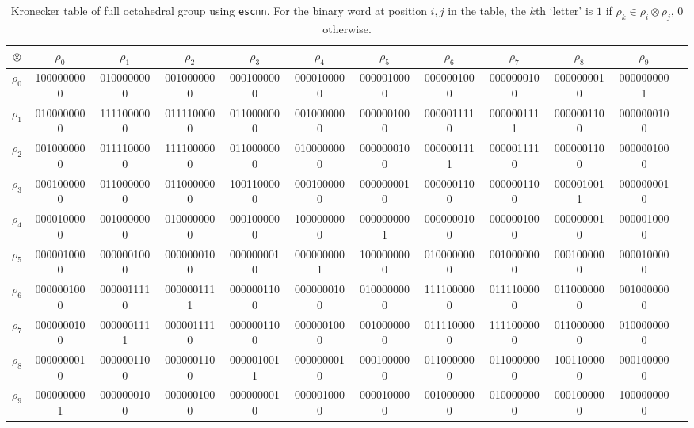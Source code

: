 \documentclass{article}
\theoremstyle{plain}
\theoremstyle{definition}
\theoremstyle{remark}
\begin{document}
\begin{table}[h]
    \centering
    \scriptsize{
    \begin{tabular}{|c||c|c|c|c|c|c|c|c|c|c|c|}
    \hline
            $\otimes$ &$\rho_0$&$\rho_1$&$\rho_2$&$\rho_3$&$\rho_4$&$\rho_5$&$\rho_6$&$\rho_7$&$\rho_8$&$\rho_9$\\
    \hline
    $\rho_0$&1000000000 & 0100000000 & 0010000000 & 0001000000 & 0000100000 & 0000010000 & 0000001000 & 0000000100 & 0000000010 & 0000000001 \\
    \hline
    $\rho_1$&0100000000 & 1111000000 & 0111100000 & 0110000000 & 0010000000 & 0000001000 & 0000011110 & 0000001111 & 0000001100 & 0000000100 \\
    \hline
    $\rho_2$&0010000000 & 0111100000 & 1111000000 & 0110000000 & 0100000000 & 0000000100 & 0000001111 & 0000011110 & 0000001100 & 0000001000 \\
    \hline
    $\rho_3$&0001000000 & 0110000000 & 0110000000 & 1001100000 & 0001000000 & 0000000010 & 0000001100 & 0000001100 & 0000010011 & 0000000010 \\
    \hline
    $\rho_4$&0000100000 & 0010000000 & 0100000000 & 0001000000 & 1000000000 & 0000000001 & 0000000100 & 0000001000 & 0000000010 & 0000010000 \\
    \hline
    $\rho_5$&0000010000 & 0000001000 & 0000000100 & 0000000010 & 0000000001 & 1000000000 & 0100000000 & 0010000000 & 0001000000 & 0000100000 \\
    \hline
    $\rho_6$&0000001000 & 0000011110 & 0000001111 & 0000001100 & 0000000100 & 0100000000 & 1111000000 & 0111100000 & 0110000000 & 0010000000 \\
    \hline
    $\rho_7$&0000000100 & 0000001111 & 0000011110 & 0000001100 & 0000001000 & 0010000000 & 0111100000 & 1111000000 & 0110000000 & 0100000000 \\
    \hline
    $\rho_8$&0000000010 & 0000001100 & 0000001100 & 0000010011 & 0000000010 & 0001000000 & 0110000000 & 0110000000 & 1001100000 & 0001000000 \\
    \hline
    $\rho_9$&0000000001 & 0000000100 & 0000001000 & 0000000010 & 0000010000 & 0000100000 & 0010000000 & 0100000000 & 0001000000 & 1000000000\\
    \hline
    \end{tabular}
    }
    \caption{Kronecker table of  full octahedral group using \texttt{escnn}. For the binary word at position $i,j$ in the table, the $k$th `letter' is $1$ if $\rho_k\in\rho_i\otimes \rho_j$, $0$ otherwise.}
    \label{tab:full_octa}
\end{table}
\end{document}
